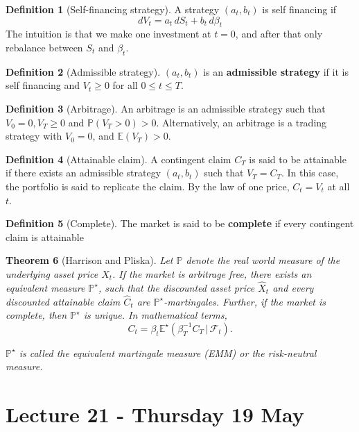 \documentclass[10pt, oneside, reqno]{amsart}
\theoremstyle{plain}%
\newtheorem{thm}{Theorem}[section]
\theoremstyle{definition}
\newtheorem{defn}[thm]{Definition}
\theoremstyle{remark}
\newcommand{\given}{ \, | \,}
\renewcommand{\P}{\mathbb{P}}
\newcommand{\E}{\mathbb{E}}
\newcommand{\sigf}{\mathcal{F}}
\begin{document}
\begin{defn}[Self-financing strategy]
	A strategy $(a_t, b_t)$ is self financing if \[
		dV_t = a_t \, dS_t + b_t \, d\beta_t
	\]  The intuition is that we make one investment at $t = 0$, and after that only rebalance between $S_t$ and $\beta_t$.  
\end{defn}

\begin{defn}[Admissible strategy]
	$(a_t, b_t)$ is an \textbf{admissible strategy} if it is self financing and $V_t \geq 0$ for all $0 \leq t \leq T$.  
\end{defn}

\begin{defn}[Arbitrage]
	An arbitrage is an admissible strategy such that $V_0 = 0, V_T \geq 0$ and $\P(V_T > 0) > 0$.  Alternatively, an arbitrage is a trading strategy with $V_0 = 0$, and $\E(V_T) > 0$.
\end{defn}

\begin{defn}[Attainable claim]
	A contingent claim $C_T$ is said to be attainable if there exists an admissible strategy $(a_t, b_t)$ such that $V_T = C_T$.  In this case, the portfolio is said to replicate the claim.  By the law of one price, $C_t = V_t$ at all $t$.
\end{defn}

\begin{defn}[Complete]
	The market is said to be \textbf{complete} if every contingent claim is attainable
\end{defn}

\begin{thm}[Harrison and Pliska]
	Let $\P$ denote the real world measure of the underlying asset price $X_t$. If the market is arbitrage free, there exists an equivalent measure $\P^\star$, such that the discounted asset price $\hat X_t$ and every discounted attainable claim $\hat C_t$ are $\P^\star$-martingales.  Further, if the market is complete, then $\P^\star$ is unique.  In mathematical terms,\[
		C_t = \beta_t \E^\star(\beta_T^{-1} C_T \given \sigf_t).
	\] 
	
	$\P^\star$ is called the equivalent martingale measure (EMM) or the risk-neutral measure.  
\end{thm}


\section{Lecture 21 - Thursday 19 May} %
\label{sec:lecture_21_thursday_19_may}
\end{document}
